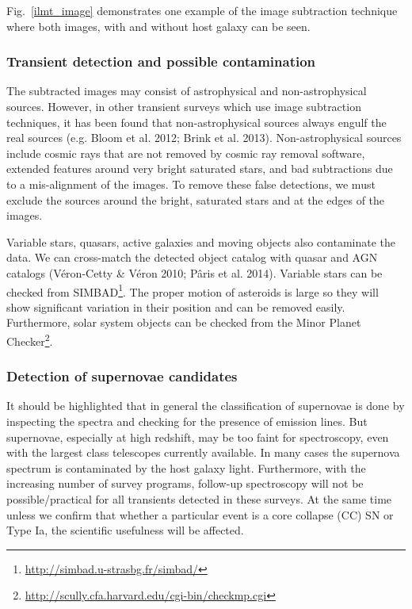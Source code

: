 \documentclass[12pt,a4paper]{article}
\begin{document}
Fig.~\ref{ilmt_image} demonstrates one example of the image subtraction technique where both 
images, with and without host galaxy can be seen.


\subsubsection{Transient detection and possible contamination}\label{contamination}

The subtracted images may consist of astrophysical and non-astrophysical sources.
However, in other transient surveys which use image subtraction techniques, it has been found 
that non-astrophysical sources always engulf the real sources (e.g. Bloom et al. 2012; 
Brink et al. 2013).
Non-astrophysical sources include cosmic rays that are not removed by cosmic ray removal 
software, extended features around very bright saturated stars, and bad subtractions due 
to a mis-alignment of the images. To remove these false detections, we must exclude the 
sources around the bright, saturated stars and at the edges of the images. 

Variable stars, quasars, active galaxies and moving objects also contaminate 
the data. We can cross-match the detected object catalog with quasar and AGN
catalogs (V\'eron-Cetty \& V\'eron 2010; P\^aris et al. 2014).
Variable stars can be checked from SIMBAD\footnote{\url{http://simbad.u-strasbg.fr/simbad/}}.
The proper motion of asteroids is large so they will show significant variation
in their position and can be removed easily. Furthermore, solar system 
objects can be checked from the Minor Planet 
Checker\footnote{\url{http://scully.cfa.harvard.edu/cgi-bin/checkmp.cgi}}.


\subsubsection{Detection of supernovae candidates}

It should be highlighted that in general the classification of supernovae is 
done by inspecting the spectra and checking for the presence of emission lines.
But supernovae, especially at high redshift, may be too faint for spectroscopy, 
even with the largest class telescopes currently available. In many cases the 
supernova spectrum is contaminated by the host galaxy light. Furthermore, with the 
increasing number of survey programs, follow-up spectroscopy will not be 
possible/practical for all transients detected in these surveys. At the same 
time unless we confirm that whether a particular event is a core collapse (CC) SN 
or Type Ia, the scientific usefulness will be affected.
\end{document}
